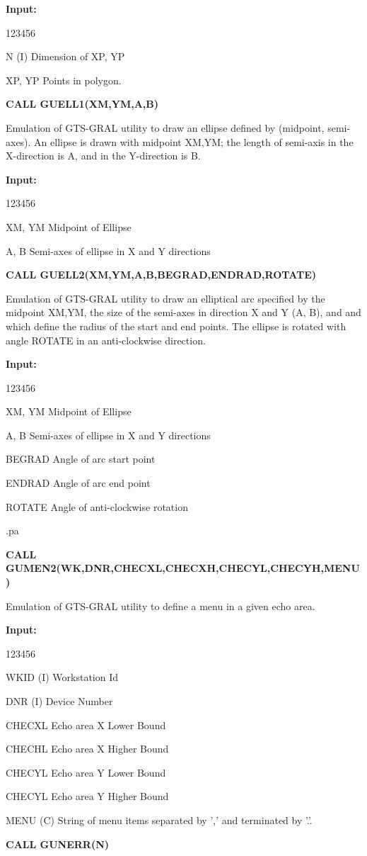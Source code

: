 \begin{OL}
{\bf Input:}
\begin{DLtt}{123456}
\item[N (I)]Dimension of XP, YP
\item[XP, YP]Points in polygon.
\end{DLtt}
\item {\bf CALL GUELL1(XM,YM,A,B)}
 
Emulation of GTS-GRAL utility to draw an ellipse defined by
(midpoint, semi-axes).
An ellipse is drawn with midpoint XM,YM; the length of semi-axis
in the X-direction is A, and in the Y-direction is B.
 
{\bf Input:}
\begin{DLtt}{123456}
\item[XM, YM] Midpoint of Ellipse
\item[A, B]Semi-axes of ellipse in X and Y directions
\end{DLtt}
\item {\bf CALL GUELL2(XM,YM,A,B,BEGRAD,ENDRAD,ROTATE)}
 
Emulation of GTS-GRAL utility to draw an elliptical arc specified by the
midpoint XM,YM, the size of the semi-axes in direction X and Y (A, B),
and  and  which define the radius of the start and end points.
The ellipse is rotated with angle ROTATE in an anti-clockwise direction.
 
{\bf Input:}
\begin{DLtt}{123456}
\item[XM, YM] Midpoint of Ellipse
\item[A, B]Semi-axes of ellipse in X and Y directions
\item[BEGRAD]Angle of arc start point
\item[ENDRAD]Angle of arc end point
\item[ROTATE]Angle of anti-clockwise rotation
\end{DLtt}
.pa
\item {\bf CALL GUMEN2(WK,DNR,CHECXL,CHECXH,CHECYL,CHECYH,MENU)}
 
Emulation of GTS-GRAL utility to define a menu in a given echo area.
 
{\bf Input:}
\begin{DLtt}{123456}
\item[WKID (I)]Workstation Id
\item[DNR (I)]Device Number
\item[CHECXL]Echo area X Lower Bound
\item[CHECHL]Echo area X Higher Bound
\item[CHECYL]Echo area Y Lower Bound
\item[CHECYL]Echo area Y Higher Bound
\item[MENU (C)]String of menu items separated by ',' and terminated
by '.'.
\end{DLtt}
\item {\bf CALL GUNERR(N)}
 

\end{OL}
